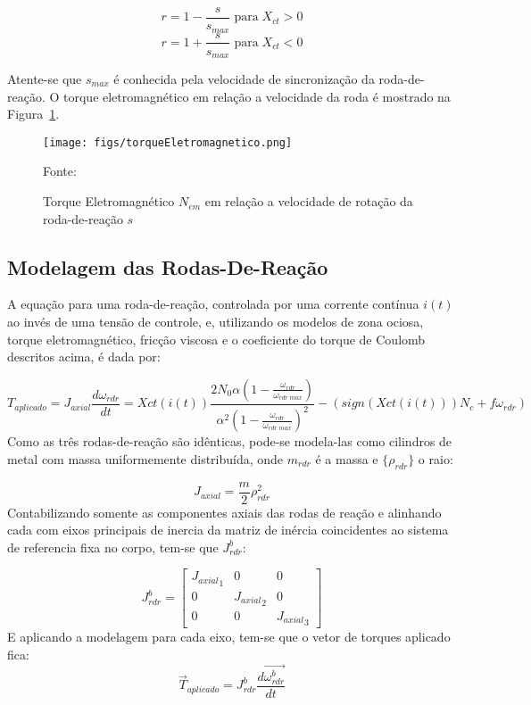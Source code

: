 \begin{equation}r=1-\frac{s}{s_{max}}\;\text{para}\;X_{ct}>0 \end{equation}\begin{equation} r=1+\frac{s}{s_{max}}\;\text{para}\;X_{ct}<0\end{equation}

Atente-se que $s_{max}$ é conhecida pela velocidade de sincronização da roda-de-reação. O torque eletromagnético em relação a velocidade da roda é mostrado na Figura~\ref{fig:15}.

\begin{figure}[htpb]
\centering
\texttt{[image: figs/torqueEletromagnetico.png]}
\caption{Torque Eletromagnético $N_{em}$ em relação a velocidade de rotação da roda-de-reação $s$}
{Fonte: \cite[p.~271]{wertz2012spacecraft}}
\label{fig:15}
\end{figure}

\subsection{Modelagem das Rodas-De-Reação}\label{sec:3.1.6.2}

A equação para uma roda-de-reação, controlada por uma corrente contínua $i(t)$ ao invés de uma tensão de controle, e, utilizando os modelos de zona ociosa,  torque eletromagnético, fricção viscosa e o coeficiente do torque de Coulomb descritos acima, é dada por:

\begin{equation}
T_{aplicado}=J_{axial}\frac{d\omega_{rdr}}{dt}=Xct(i(t))\frac{2N_0\alpha\left (1-\frac{\omega_{rdr}}{\omega_{rdr\;max}} \right )}{\alpha^2\left (1-\frac{\omega_{rdr}}{\omega_{rdr\;max}} \right )^2}-\left (sign(Xct(i(t)))N_c+f\omega_{rdr}\right )
\end{equation}
Como as três rodas-de-reação são idênticas, pode-se modela-las como cilindros de metal com massa uniformemente distribuída, onde $m_{rdr}$ é a massa e $\{\rho_{rdr}\}$ o raio:

\begin{equation}{J_{axial}}=\frac{m}{2}\rho^2_{rdr}\end{equation}Contabilizando somente as componentes axiais das rodas de reação e alinhando cada com eixos principais de inercia da matriz de inércia coincidentes ao sistema de referencia fixa no corpo, tem-se que   $J^b_{rdr}$:

\begin{equation}J^b_{rdr} =\begin{bmatrix}
{J_{axial}}_1&0&0 \\0 &{J_{axial}}_2&0 \\ 0&0&{J_{axial}}_3
\end{bmatrix}\end{equation}E aplicando a modelagem para cada eixo, tem-se que o vetor de torques aplicado fica:
\begin{equation}
\vec{T}_{aplicado}=J^b_{rdr}\frac{d\vec{\omega^b_{rdr}}}{dt}
\end{equation}


